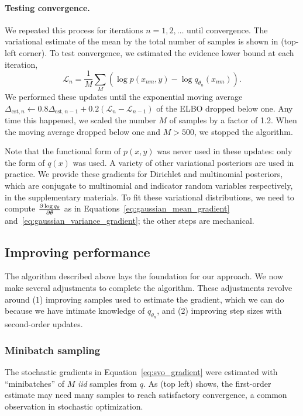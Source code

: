 \paragraph{Testing convergence.}
We repeated this process for iterations $n = 1, 2, \ldots$ until
convergence.  The variational estimate of the mean by the total number of
samples is shown in 
(top-left corner).  To test convergence, we estimated the evidence
lower bound at each iteration,
\[
  \mathcal{L}_n = \frac{1}{M} \sum_M \left( \log p(x_{nm}, y) - \log
q_{\theta_n}(x_{nm}) \right).
\]
We performed these updates until the exponential moving average
$\Delta_{\mbox{est},n} \gets 0.8 \Delta_{\mbox{est},{n-1}} + 0.2
(\mathcal{L}_n - \mathcal{L}_{n-1})$ of the ELBO dropped below one.
Any time this happened, we scaled the number $M$ of samples by a
factor of 1.2. When the moving average dropped below one and $M >
500$, we stopped the algorithm.

Note that the functional form of $p(x, y)$ was never used in these
updates: only the form of $q(x)$ was used.  A variety of other
variational posteriors are used in practice.  We provide these
gradients for Dirichlet and multinomial posteriors, which are
conjugate to multinomial and indicator random variables respectively,
in the supplementary materials. To fit these variational
distributions, we need to compute $\frac{\partial \log q_\theta}{\partial \theta}$ as
in Equations~\ref{eq:gaussian_mean_gradient}
and~\ref{eq:gaussian_variance_gradient}; the other steps are
mechanical.

\subsection{Improving performance}

The algorithm described above lays the foundation for our approach.  We
now make several adjustments to complete the algorithm.  These
adjustments revolve around (1) improving samples used to estimate the
gradient, which we can do because we have intimate knowledge of
$q_{\theta_n}$, and (2) improving step sizes with second-order updates.

\subsubsection{Minibatch sampling}
\label{section:minibatch_sampling}
The stochastic gradients in Equation~\ref{eq:svo_gradient} were
estimated with ``minibatches'' of $M$ \emph{iid} samples from $q$.  As
 (top left) shows, the
first-order estimate may need many samples to reach satisfactory
convergence, a common observation in stochastic optimization.

